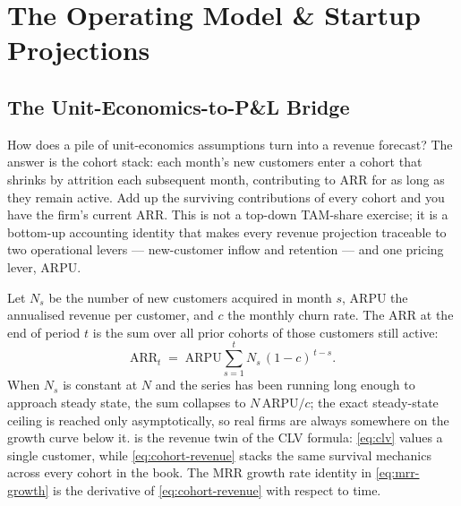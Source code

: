 \chapter{The Operating Model \& Startup Projections}\label{ch:operating-model}


\section{The Unit-Economics-to-P\&L Bridge}\label{sec:unit-econ-to-pl}

How does a pile of unit-economics assumptions turn into a revenue forecast? The answer is the
cohort stack: each month's new customers enter a cohort that shrinks by attrition each
subsequent month, contributing to ARR for as long as they remain active. Add up the surviving
contributions of every cohort and you have the firm's current ARR. This is not a top-down
TAM-share exercise; it is a bottom-up accounting identity that makes every revenue projection
traceable to two operational levers --- new-customer inflow and retention --- and one pricing
lever, ARPU.

Let $N_s$ be the number of new customers acquired in month $s$, ARPU the annualised revenue per
customer, and $c$ the monthly churn rate. The ARR at the end of period $t$ is the sum over all
prior cohorts of those customers still active:
\begin{equation}\label{eq:cohort-revenue}
  \mathrm{ARR}_{t}
  \;=\;
  \mathrm{ARPU}
  \sum_{s=1}^{t}
  N_{s}\,(1-c)^{\,t-s}.
\end{equation}
When $N_s$ is constant at $N$ and the series has been running long enough to approach steady
state, the sum collapses to $N\,\mathrm{ARPU}/c$; the exact steady-state ceiling is reached only
asymptotically, so real firms are always somewhere on the growth curve below it.
 is the revenue twin of the CLV formula: \cref{eq:clv} values a single
customer, while \cref{eq:cohort-revenue} stacks the same survival mechanics across every cohort
in the book. The MRR growth rate identity in \cref{eq:mrr-growth} is the derivative of
\cref{eq:cohort-revenue} with respect to time.

